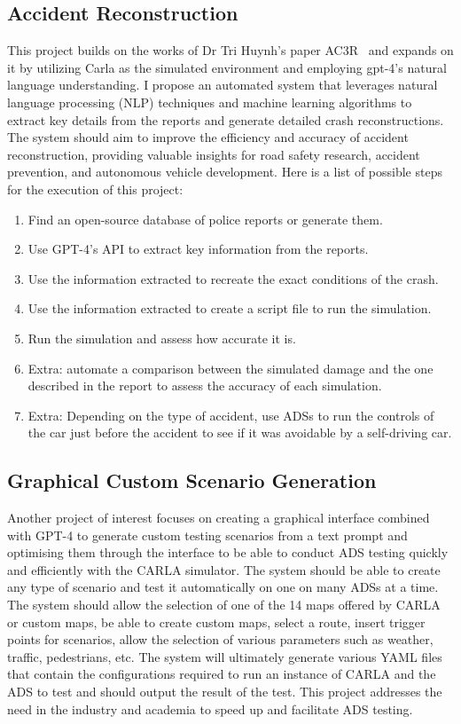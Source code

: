 \documentclass[a4paper]{article}
\begin{document}
\subsection{Accident Reconstruction}
This project builds on the works of Dr Tri Huynh's paper AC3R~\cite{huynh2019ac3r} and expands on it by utilizing Carla as the simulated environment and employing gpt-4's natural language understanding. I propose an automated system that leverages natural language processing (NLP) techniques and machine learning algorithms to extract key details from the reports and generate detailed crash reconstructions. 
The system should aim to improve the efficiency and accuracy of accident reconstruction, providing valuable insights for road safety research, accident prevention, and autonomous vehicle development.
Here is a list of possible steps for the execution of this project:
\begin{enumerate}
  \item Find an open-source database of police reports or generate them.
  \item Use GPT-4's API to extract key information from the reports.
  \item Use the information extracted to recreate the exact conditions of the crash.
  \item Use the information extracted to create a script file to run the simulation.
  \item Run the simulation and assess how accurate it is.
  \item Extra: automate a comparison between the simulated damage and the one described in the report to assess the accuracy of each simulation.
  \item Extra: Depending on the type of accident, use ADSs to run the controls of the car just before the accident to see if it was avoidable by a self-driving car.
\end{enumerate}

\subsection{Graphical Custom Scenario Generation}
Another project of interest focuses on creating a graphical interface combined with GPT-4 to generate custom testing scenarios from a text prompt and optimising them through the interface to be able to conduct ADS testing quickly and efficiently with the CARLA simulator. The system should be able to create any type of scenario and test it automatically on one on many ADSs at a time. The system should allow the selection of one of the 14 maps offered by CARLA or custom maps, be able to create custom maps, select a route, insert trigger points for scenarios, allow the selection of various parameters such as weather, traffic, pedestrians, etc. The system will ultimately generate various YAML files that contain the configurations required to run an instance of CARLA and the ADS to test and should output the result of the test. This project addresses the need in the industry and academia to speed up and facilitate ADS testing.
\end{document}
